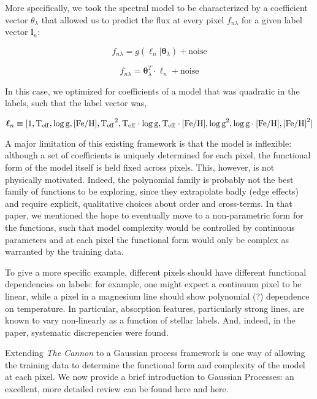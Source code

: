 \documentclass[12pt, preprint]{aastex}
\newcommand{\set}[1]{\bm{#1}}
\newcommand{\starlabel}{\ell}
\newcommand{\starlabelvec}{\set{\starlabel}}
\newcommand{\teff}{\mbox{$\rm T_{eff}$}}
\newcommand{\feh}{\mbox{$\rm [Fe/H]$}}
\newcommand{\logg}{\mbox{$\rm \log g$}}
\begin{document}
More specifically, we took the 
spectral model to be characterized by a coefficient vector $\theta_\lambda$ 
that allowed us to predict the flux at every pixel $f_{n \lambda}$ for a 
given label vector $\textbf{l}_n$:

\begin{equation}
  f_{n\lambda} = g(\starlabelvec_n | \set{\theta}_\lambda) + \mbox{noise} 
\end{equation}

\begin{equation}
  f_{n\lambda} = \set{\theta}_\lambda^T \cdot \starlabelvec_n + \mbox{noise}  
\end{equation}

In this case, we optimized for coefficients of a model that was quadratic in the
labels, such that the label vector was,

\begin{equation}
  \starlabelvec_n \equiv 
  [1, \teff, \logg, \feh, \teff^2, \teff\cdot\logg, \teff\cdot\feh, \logg^2, \logg\cdot\feh, \feh^2]
\end{equation}

A major limitation of this existing framework is that the model is inflexible:
although a set of coefficients is uniquely determined for each pixel, 
the functional form of the model itself is held fixed across pixels. 
This, however, is not physically motivated. Indeed, the
polynomial family is probably not the best family of functions to be 
exploring, since they extrapolate badly (edge effects) and require explicit, 
qualitative choices about order and cross-terms. In that paper, we mentioned 
the hope to eventually move to a non-parametric form for the functions, 
such that model complexity would be controlled by continuous parameters
and at each pixel the functional form would only be complex as warranted
by the training data.

To give a more specific example, different pixels should have 
different functional dependencies on labels: for example, one might expect a 
continuum pixel to be linear, while a pixel in a magnesium line should show 
polynomial (?) dependence on temperature. In particular, absorption features,
particularly strong lines, are known to vary non-linearly as a function of 
stellar labels. And, indeed, in the paper, systematic discrepencies were found. 

Extending \emph{The Cannon} to a Gaussian process framework is one way of 
allowing the training data to determine the functional form and complexity
of the model at each pixel. We now provide a brief introduction to Gaussian
Processes: an excellent, more detailed review can be found here and here. 
\end{document}
